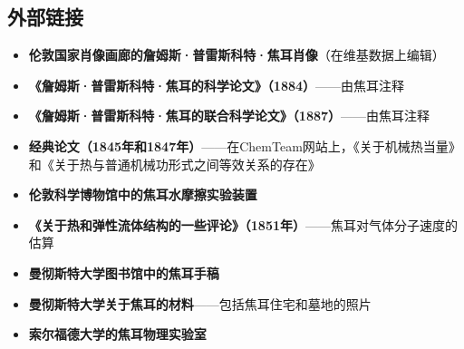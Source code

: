 \subsection{外部链接}
\begin{itemize}
\item \textbf{伦敦国家肖像画廊的詹姆斯·普雷斯科特·焦耳肖像}（在维基数据上编辑）  
\item \textbf{《詹姆斯·普雷斯科特·焦耳的科学论文》（1884）}——由焦耳注释  
\item \textbf{《詹姆斯·普雷斯科特·焦耳的联合科学论文》（1887）}——由焦耳注释  
\item \textbf{经典论文（1845年和1847年）}——在ChemTeam网站上，《关于机械热当量》和《关于热与普通机械功形式之间等效关系的存在》 
\item \textbf{伦敦科学博物馆中的焦耳水摩擦实验装置 } 
\item \textbf{《关于热和弹性流体结构的一些评论》（1851年）}——焦耳对气体分子速度的估算  
\item \textbf{曼彻斯特大学图书馆中的焦耳手稿}  
\item \textbf{曼彻斯特大学关于焦耳的材料}——包括焦耳住宅和墓地的照片  
\item \textbf{索尔福德大学的焦耳物理实验室}
\end{itemize}